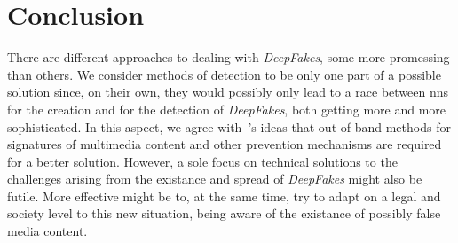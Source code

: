 \section{Conclusion}
There are different approaches to dealing with \textit{DeepFakes}, some more
promessing than others.
We consider methods of detection to be only one part of a possible solution since,
on their own, they would possibly only lead to a race between \glspl{nn} for
the creation and for the detection of \textit{DeepFakes}, both getting more and
more sophisticated. In this aspect, we agree with~\textcite{Mirsky.2020}'s ideas that 
out-of-band methods for signatures of multimedia content and other prevention
mechanisms are required for a better solution.
However, a sole focus on technical solutions to the challenges arising from the 
existance and spread of \textit{DeepFakes} might also be futile. More effective
might be to, at the same time, try to adapt on a legal and society level to this
new situation, being aware of the existance of possibly false media content.

